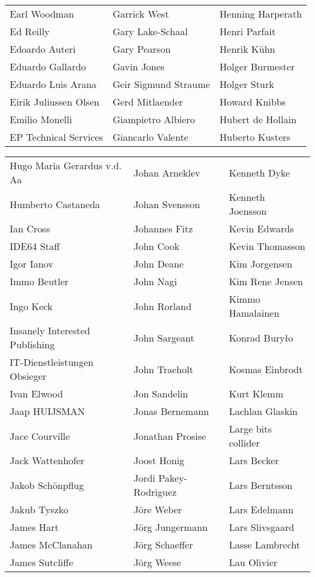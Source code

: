 \begin{tabular}{p{4.5cm}p{4.5cm}p{4.5cm}}
Earl Woodman & Garrick West & Henning Harperath \\
Ed Reilly & Gary Lake-Schaal & Henri Parfait \\
Edoardo Auteri & Gary Pearson & Henrik Kühn \\
Eduardo Gallardo & Gavin Jones & Holger Burmester \\
Eduardo Luis Arana & Geir Sigmund Straume & Holger Sturk \\
Eirik Juliussen Olsen & Gerd Mitlaender & Howard Knibbs \\
Emilio Monelli & Giampietro Albiero & Hubert de Hollain \\
EP Technical Services & Giancarlo Valente & Huberto Kusters \\
\end{tabular}
\newpage
\setlength{\tabcolsep}{1mm}
\begin{tabular}{p{4.5cm}p{4.5cm}p{4.5cm}}
Hugo Maria Gerardus v.d. Aa & Johan Arneklev & Kenneth Dyke \\
Humberto Castaneda & Johan Svensson & Kenneth Joensson \\
Ian Cross & Johannes Fitz & Kevin Edwards \\
IDE64 Staff & John Cook & Kevin Thomasson \\
Igor Ianov & John Deane & Kim Jorgensen \\
Immo Beutler & John Nagi & Kim Rene Jensen \\
Ingo Keck & John Rorland & Kimmo Hamalainen \\
Insanely Interested Publishing & John Sargeant & Konrad Buryło \\
IT-Dienstleistungen Obsieger & John Traeholt & Kosmas Einbrodt \\
Ivan Elwood & Jon Sandelin & Kurt Klemm \\
Jaap HUIJSMAN & Jonas Bernemann & Lachlan Glaskin \\
Jace Courville & Jonathan Prosise & Large bits collider \\
Jack Wattenhofer & Joost Honig & Lars Becker \\
Jakob Schönpflug & Jordi Pakey-Rodriguez & Lars Berntsson \\
Jakub Tyszko & Jöre Weber & Lars Edelmann \\
James Hart & Jörg Jungermann & Lars Slivsgaard \\
James McClanahan & Jörg Schaeffer & Lasse Lambrecht \\
James Sutcliffe & Jörg Weese & Lau Olivier \\

\end{tabular}
